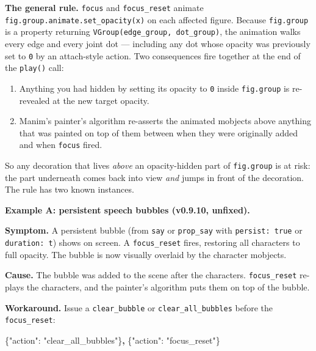 \documentclass[
  11pt,
]{book}
\newenvironment{Shaded}{}{}
\newcommand{\DataTypeTok}[1]{\textcolor[rgb]{0.56,0.13,0.00}{#1}}
\newcommand{\ErrorTok}[1]{\textcolor[rgb]{1.00,0.00,0.00}{\textbf{#1}}}
\newcommand{\FunctionTok}[1]{\textcolor[rgb]{0.02,0.16,0.49}{#1}}
\newcommand{\StringTok}[1]{\textcolor[rgb]{0.25,0.44,0.63}{#1}}
\providecommand{\tightlist}{%
  \setlength{\itemsep}{0pt}\setlength{\parskip}{0pt}}
\begin{document}
\textbf{The general rule.} \texttt{focus} and \texttt{focus\_reset}
animate \texttt{fig.group.animate.set\_opacity(x)} on each affected
figure. Because \texttt{fig.group} is a property returning
\texttt{VGroup(edge\_group,\ dot\_group)}, the animation walks every
edge and every joint dot --- including any dot whose opacity was
previously set to \texttt{0} by an attach-style action. Two consequences
fire together at the end of the \texttt{play()} call:

\begin{enumerate}
\tightlist
\item
  Anything you had hidden by setting its opacity to \texttt{0} inside
  \texttt{fig.group} is re-revealed at the new target opacity.
\item
  Manim's painter's algorithm re-asserts the animated mobjects above
  anything that was painted on top of them between when they were
  originally added and when \texttt{focus} fired.
\end{enumerate}

So any decoration that lives \emph{above} an opacity-hidden part of
\texttt{fig.group} is at risk: the part underneath comes back into view
\emph{and} jumps in front of the decoration. The rule has two known
instances.

\medskip

\textbf{Example A: persistent speech bubbles (v0.9.10, unfixed).}

\textbf{Symptom.} A persistent bubble (from \texttt{say} or
\texttt{prop\_say} with \texttt{persist:\ true} or \texttt{duration:\ t})
shows on screen. A \texttt{focus\_reset} fires, restoring all characters
to full opacity. The bubble is now visually overlaid by the character
mobjects.

\textbf{Cause.} The bubble was added to the scene after the characters.
\texttt{focus\_reset} re-plays the characters, and the painter's
algorithm puts them on top of the bubble.

\textbf{Workaround.} Issue a \texttt{clear\_bubble} or
\texttt{clear\_all\_bubbles} before the \texttt{focus\_reset}:

\begin{Shaded}
\begin{Highlighting}[]
\FunctionTok{\{}\DataTypeTok{"action"}\FunctionTok{:} \StringTok{"clear\_all\_bubbles"}\FunctionTok{\}}\ErrorTok{,}
\FunctionTok{\{}\DataTypeTok{"action"}\FunctionTok{:} \StringTok{"focus\_reset"}\FunctionTok{\}}
\end{Highlighting}
\end{Shaded}
\end{document}
